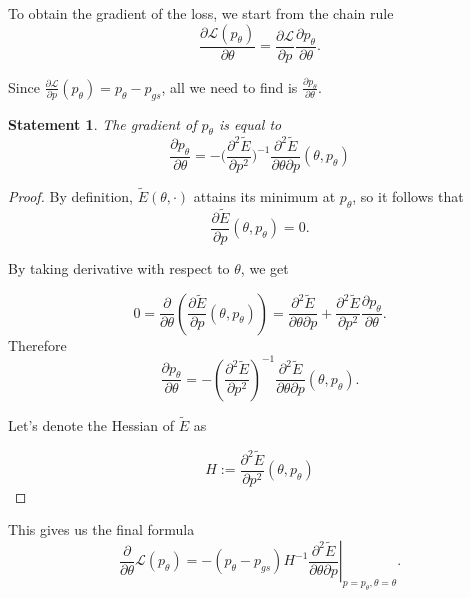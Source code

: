 \documentclass[a4paper,10pt]{report}
\newtheorem{statement}{Statement}
\begin{document}
To obtain the gradient of the loss, we start from the chain rule
\begin{equation}
 \frac{\partial \mathcal{L}(p_\theta)}{\partial \theta} = \frac{\partial \mathcal{L}}{\partial p}\frac{\partial p_\theta}{\partial \theta}.
\end{equation}

Since $\frac{\partial \mathcal{L}}{\partial p}(p_\theta)= p_\theta-p_{gs}$, all we need to find is $\frac{\partial p_\theta}{\partial \theta}.$

\begin{statement}
The gradient of $p_\theta$ is equal to
 \begin{equation}
   \frac{\partial p_\theta}{\partial \theta} = -\bigg(\frac{\partial^2 \widetilde{E}}{\partial p^2}\bigg)^{-1} \frac{\partial^2 \widetilde{E}}{\partial \theta \partial p}(\theta, p_\theta)
 \end{equation}
\end{statement}

\begin{proof}
By definition, $\widetilde{E}(\theta, \cdot)$ attains its minimum at $p_\theta$, so it follows that
\begin{equation}
\frac{\partial \widetilde{E}}{\partial p}(\theta, p_\theta) = 0.
\end{equation}

By taking derivative with respect to $\theta$, we get

\begin{equation}
0=\frac{\partial}{\partial \theta}\left(\frac{\partial \widetilde{E}}{\partial p}(\theta, p_\theta)\right) = \frac{\partial^2 \widetilde{E}}{\partial \theta \partial p} + \frac{\partial^2 \widetilde{E}}{\partial p^2} \frac{\partial p_\theta}{\partial \theta}.
\end{equation}
Therefore
\begin{equation}
 \frac{\partial p_\theta}{\partial \theta} = -\left(\frac{\partial^2 \widetilde{E}}{\partial p^2}\right)^{-1} \frac{\partial^2 \widetilde{E}}{\partial \theta \partial p}(\theta, p_\theta).
\end{equation}

Let's denote the Hessian of $\widetilde{E}$ as

\begin{equation}
H := \frac{\partial^2 \widetilde{E}}{\partial p^2}(\theta,p_\theta)
\end{equation}
\end{proof}
This gives us the final formula
\begin{equation}
 \frac{\partial}{\partial \theta}\mathcal{L}(p_\theta) = - (p_\theta - p_{gs}) H^{-1}  \left.\frac{\partial^2 \widetilde{E}}{\partial \theta \partial p}\right|_{p=p_\theta, \theta=\theta}.
\end{equation}
\end{document}
